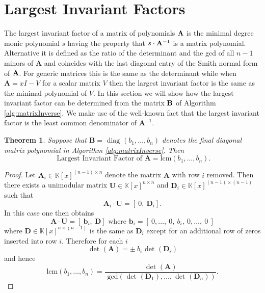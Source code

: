 \documentclass[a4paper,11pt]{article}
\newtheorem{thm}{Theorem}
\begin{document}
\section{Largest Invariant Factors}\label{sec:invariants}

The largest invariant factor of a matrix of polynomials ${\bf A}$ is the minimal degree monic polynomial $s$ having the property that $s \cdot {\bf A}^{-1}$ is a matrix polynomial. Alternative it is defined as the ratio of the determinant and the gcd of all $n-1$ minors of $\mathbf{A}$ and  coincides with the last diagonal entry of the Smith normal form of ${\bf A}$. For generic matrices this is the same as the determinant while when $\mathbf{A} = x I - V$ for a scalar matrix $V$ then the largest invariant factor is the same as the minimal polynomial of $V$. In this section we will show how the largest invariant factor can be determined from the matrix ${\bf B}$ of Algorithm \ref{alg:matrixInverse}. We make use of the well-known fact that the largest invariant factor is the least common denominator of $\mathbf{A}^{-1}$.

\begin{thm}
Suppose that ${\mathbf{B}} = \mbox{ diag }( b_1, \ldots , b_n)$ denotes the final diagonal matrix polynomial  in Algorithm \ref{alg:matrixInverse}. Then
$$
\mbox{ Largest Invariant Factor of } {\mathbf{A}} = \mbox{lcm}( b_{1}, \ldots , b_{n} ).
$$
\end{thm}
\begin{proof}
Let ${\mathbf{A}_i} \in \mathbb{K}\left[x\right]^{(n-1)\times n}$ denote the matrix ${\mathbf{A}}$ with row $i$ removed. Then there exists a unimodular matrix ${\mathbf{U}} \in \mathbb{K}\left[x\right]^{n \times n}$ and ${\mathbf{D}_i} \in \mathbb{K}\left[x\right]^{(n-1)\times (n-1)}$ such that
$$
{\mathbf{A}_i} \cdot {\mathbf{U}} = [ ~0, ~{\mathbf{D}_i}].
$$
In this case one then obtains
$$
{\mathbf{A}} \cdot {\mathbf{U}} = [ ~{\mathbf{b}}_i, ~{\mathbf{D}}] \mbox{ where } {\mathbf{b}}_i = [~0, \ldots , ~0,~ b_{i}, ~0, \ldots,~ 0~]
$$
where ${\mathbf{D}} \in \mathbb{K}\left[x\right]^{n\times (n-1)}$ is the same as ${\mathbf{D}_i}$
except for an additional row of zeros inserted into row $i$. Therefore for each $i$ 
$$
 \mbox{ det }({\mathbf{A}})  = \pm ~ b_{i}  \mbox{ det }({\mathbf{D}_i} )
$$
and hence
$$
\mbox{lcm}( b_{1}, \ldots , b_{n} ) = \frac{ \mbox{ det }({\mathbf{A}}) }{\mbox{ gcd}(
\mbox{ det }({\mathbf{D}_1} ), \ldots , \mbox{ det }({\mathbf{D}_n} ) ) }.
$$
\end{proof}
\end{document}
